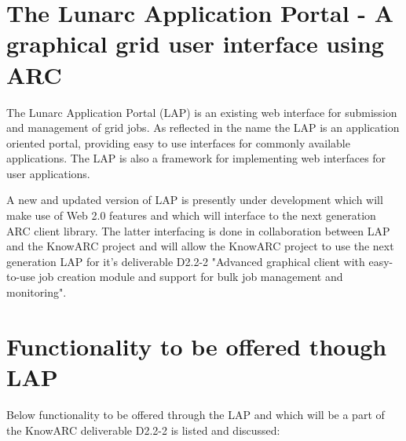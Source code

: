\documentclass[11pt,oneside,a4paper,english]{article}
\begin{document}
\section*{The Lunarc Application Portal - A graphical grid user interface using ARC}
The Lunarc Application Portal (LAP) is an existing web interface for
submission and management of grid jobs. As reflected in the name the
LAP is an application oriented portal, providing easy to use
interfaces for commonly available applications. The LAP is also a
framework for implementing web interfaces for user applications.

A new and updated version of LAP is presently under development which
will make use of Web 2.0 features and which will interface to the next
generation ARC client library. The latter interfacing is done in
collaboration between LAP and the KnowARC project and will allow the
KnowARC project to use the next generation LAP for it's deliverable
D2.2-2 "Advanced graphical client with easy-to-use job creation module
and support for bulk job management and monitoring".

\section*{Functionality to be offered though LAP}
Below functionality to be offered through the LAP and which will be a
part of the KnowARC deliverable D2.2-2 is listed and discussed:
\end{document}
